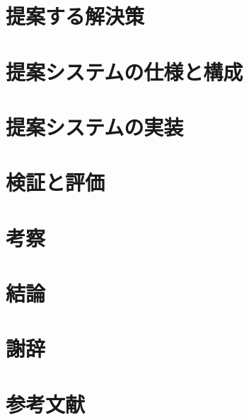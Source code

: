 \documentclass[a4paper]{jreport}
\begin{document}
\chapter{提案する解決策}


\chapter{提案システムの仕様と構成}
 

\chapter{提案システムの実装}

\chapter{検証と評価}

\chapter{考察}
\chapter{結論}
\chapter{謝辞}
\chapter{参考文献}
\end{document}
